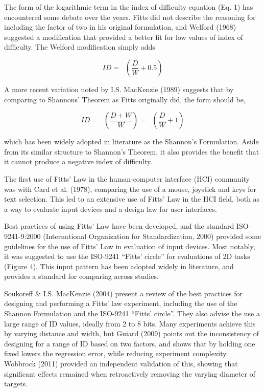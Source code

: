 The form of the logarithmic term in the index of difficulty equation (Eq. 1) has encountered some debate over the years. Fitts did not describe the reasoning for including the factor of two in his original formulation, and Welford (1968) suggested a modification that provided a better fit for low values of index of difficulty. The Welford modification simply adds

\[ID = \operatorname{}\left( \frac{D}{W} + 0.5 \right)\]

A more recent variation noted by I.S. MacKenzie (1989) suggests that by comparing to Shannons' Theorem as Fitts originally did, the form should be,

\[ID = \operatorname{}\left( \frac{D + W}{W} \right) = \operatorname{}\left( \frac{D}{W} + 1 \right)\]

which has been widely adopted in literature as the Shannon's Formulation. Aside from its similar structure to Shannon's Theorem, it also provides the benefit that it cannot produce a negative index of difficulty.

The first use of Fitts' Law in the human-computer interface (HCI) community was with Card et al. (1978), comparing the use of a mouse, joystick and keys for text selection. This led to an extensive use of Fitts' Law in the HCI field, both as a way to evaluate input devices and a design law for user interfaces.

Best practices of using Fitts' Law have been developed, and the standard ISO-9241-9:2000 (International Organization for Standardization, 2000) provided some guidelines for the use of Fitts' Law in evaluation of input devices. Most notably, it was suggested to use the ISO-9241 ``Fitts' circle'' for evaluations of 2D tasks (Figure 4). This input pattern has been adopted widely in literature, and provides a standard for comparing across studies.

Soukoreff \& I.S. MacKenzie (2004) present a review of the best practices for designing and performing a Fitts' law experiment, including the use of the Shannon Formulation and the ISO-9241 ``Fitts' circle''. They also advise the use a large range of ID values, ideally from 2 to 8 bits. Many experiments achieve this by varying distance and width, but Guiard (2009) points out the inconsistency of designing for a range of ID based on two factors, and shows that by holding one fixed lowers the regression error, while reducing experiment complexity. Wobbrock (2011) provided an independent validation of this, showing that significant effects remained when retroactively removing the varying diameter of targets.

